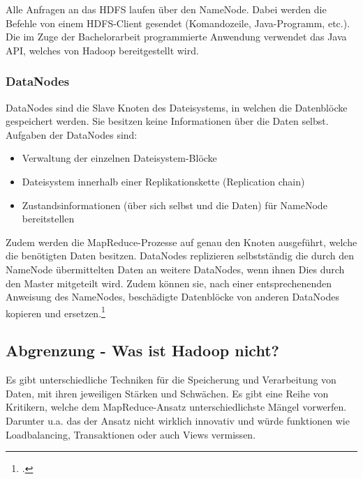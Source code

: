 Alle Anfragen an das \ac{HDFS} laufen über den NameNode. Dabei werden die Befehle von einem \ac{HDFS}-Client gesendet (Komandozeile, Java-Programm, etc.). Die im Zuge der Bachelorarbeit programmierte Anwendung verwendet das Java \ac{API}, welches von Hadoop bereitgestellt wird.

\subsubsection{DataNodes}
DataNodes sind die Slave Knoten des Dateisystems, in welchen die Datenblöcke gespeichert werden. Sie besitzen keine Informationen über die Daten selbst. Aufgaben der DataNodes sind:

\begin{itemize}
	\item Verwaltung der einzelnen Dateisystem-Blöcke
	\item Dateisystem innerhalb einer Replikationskette (Replication chain)
	\item Zustandsinformationen (über sich selbst und die Daten) für NameNode bereitstellen
\end{itemize}

Zudem werden die MapReduce-Prozesse auf genau den Knoten ausgeführt, welche die benötigten Daten besitzen. DataNodes replizieren selbstständig die durch den NameNode übermittelten Daten an weitere DataNodes, wenn ihnen Dies durch den Master mitgeteilt wird. Zudem können sie, nach einer entsprechenenden Anweisung des NameNodes, beschädigte Datenblöcke von anderen DataNodes kopieren und ersetzen.\footcite[Vgl.][S. 25 f.]{Wartala.2012}



\subsection{Abgrenzung - Was ist Hadoop nicht?}
Es gibt unterschiedliche Techniken für die Speicherung und Verarbeitung von Daten, mit ihren jeweiligen Stärken und Schwächen. Es gibt eine Reihe von Kritikern, welche dem MapReduce-Ansatz unterschiedlichste Mängel vorwerfen. Darunter u.a. das der Ansatz nicht wirklich innovativ und würde funktionen wie Loadbalancing, Transaktionen oder auch Views vermissen.

